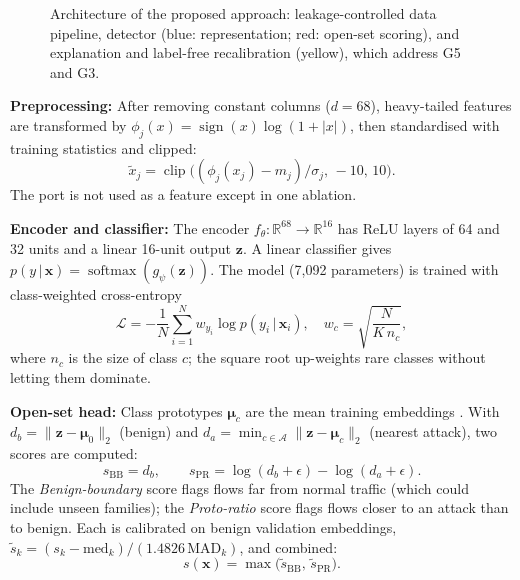 \documentclass[pdflatex,sn-mathphys-num,iicol]{sn-jnl}%
\begin{document}
\begin{figure}[t]
{}
\caption{Architecture of the proposed approach: leakage-controlled data pipeline, detector (blue: representation; red: open-set scoring), and explanation and label-free recalibration (yellow), which address G5 and G3.}\label{fig:arch}
\end{figure}

\textbf{Preprocessing:} After removing constant columns ($d=68$), heavy-tailed features are transformed by $\phi_j(x)=\operatorname{sign}(x)\log(1+|x|)$, then standardised with training statistics and clipped:
\begin{equation}
\tilde{x}_j=\operatorname{clip}\big((\phi_j(x_j)-m_j)/\sigma_j,\,-10,\,10\big).\label{eq:pre}
\end{equation}
The port is not used as a feature except in one ablation.

\textbf{Encoder and classifier:} The encoder $f_\theta:\mathbb{R}^{68}\to\mathbb{R}^{16}$ has ReLU layers of 64 and 32 units and a linear 16-unit output $\mathbf{z}$. A linear classifier gives $p(y\,|\,\mathbf{x})=\operatorname{softmax}(g_\psi(\mathbf{z}))$. The model (7,092 parameters) is trained with class-weighted cross-entropy
\begin{equation}
\mathcal{L}=-\frac{1}{N}\sum_{i=1}^{N} w_{y_i}\log p(y_i\,|\,\mathbf{x}_i),\quad w_c=\sqrt{\frac{N}{K\,n_c}},\label{eq:loss}
\end{equation}
where $n_c$ is the size of class $c$; the square root up-weights rare classes without letting them dominate.

\textbf{Open-set head:} Class prototypes $\boldsymbol{\mu}_c$ are the mean training embeddings \cite{snell2017proto}. With $d_b=\lVert\mathbf{z}-\boldsymbol{\mu}_0\rVert_2$ (benign) and $d_a=\min_{c\in\mathcal{A}}\lVert\mathbf{z}-\boldsymbol{\mu}_c\rVert_2$ (nearest attack), two scores are computed:
\begin{equation}
s_{\mathrm{BB}}=d_b,\qquad s_{\mathrm{PR}}=\log(d_b+\epsilon)-\log(d_a+\epsilon).\label{eq:raw}
\end{equation}
The \emph{Benign-boundary} score flags flows far from normal traffic (which could include unseen families); the \emph{Proto-ratio} score flags flows closer to an attack than to benign. Each is calibrated on benign validation embeddings, $\tilde{s}_k=(s_k-\mathrm{med}_k)/(1.4826\,\mathrm{MAD}_k)$, and combined:
\begin{equation}
s(\mathbf{x})=\max\big(\tilde{s}_{\mathrm{BB}},\,\tilde{s}_{\mathrm{PR}}\big).\label{eq:score}
\end{equation}
\end{document}
